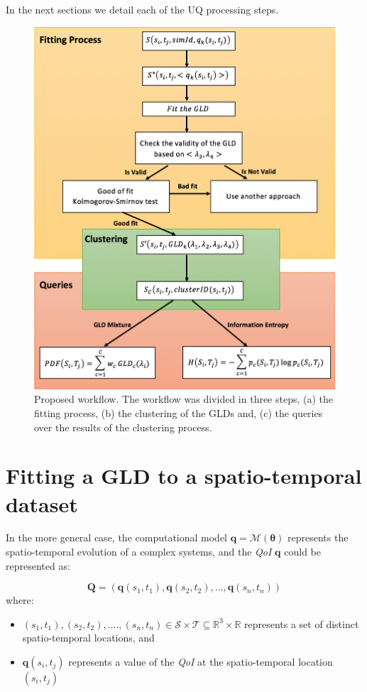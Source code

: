 In the next sections we detail each of the UQ processing steps.

\begin{figure}[H]
    \centering
    \includegraphics[width=1\textwidth]{img/Diagram.png}
    \caption{Proposed workflow. The workflow was divided in three steps, (a) the fitting process, (b) the clustering of the GLDs and, (c) the queries over the results of the clustering process.}
    \label{fig:workflow}
\end{figure}

\section{Fitting a GLD to a spatio-temporal dataset}\label{sec:fitting}
In the more general case, the computational model $\bm{q}=\mathcal{M}(\bm{\theta})$ represents the spatio-temporal evolution of a complex systems, and the \textit{QoI} $\bm{q}$ could be represented as:  

\begin{equation} \label{eq:spatio_temporal}
\mathbf{Q} = (\mathbf{q}(s_{1},t_{1}),\mathbf{q}(s_{2},t_{2}),...,\mathbf{q}(s_{n},t_{n}))  
\end{equation}
where:
\begin{itemize}
\item $(s_{1},t_{1}),(s_{2},t_{2}),....,(s_{n},t_{n}) \in \mathcal{S} \times \mathcal{T}\subseteq\mathbb{R}^{3}\times\mathbb{R}$ represents a set of distinct spatio-temporal locations, and
\item $\mathbf{q}(s_{i},t_{j})$ represents a value of the \textit{QoI} at the spatio-temporal location $(s_{i},t_{j})$
\end{itemize}

